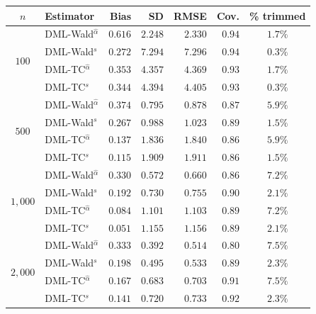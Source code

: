 \begin{tabular}{clrrrrc}
\toprule
$n$ & Estimator & Bias & SD & RMSE & Cov. & \% trimmed \\
\midrule
\multirow{4}{*}{$100$}
  & DML-Wald$^{\hat\alpha}$ & $0.616$ & $2.248$ & $2.330$ & $0.94$ & $1.7\%$ \\
  & DML-Wald$^{s}$          & $0.272$ & $7.294$ & $7.296$ & $0.94$ & $0.3\%$ \\
  & DML-TC$^{\hat\alpha}$   & $0.353$ & $4.357$ & $4.369$ & $0.93$ & $1.7\%$ \\
  & DML-TC$^{s}$            & $0.344$ & $4.394$ & $4.405$ & $0.93$ & $0.3\%$ \\
\midrule
\multirow{4}{*}{$500$}
  & DML-Wald$^{\hat\alpha}$ & $0.374$ & $0.795$ & $0.878$ & $0.87$ & $5.9\%$ \\
  & DML-Wald$^{s}$          & $0.267$ & $0.988$ & $1.023$ & $0.89$ & $1.5\%$ \\
  & DML-TC$^{\hat\alpha}$   & $0.137$ & $1.836$ & $1.840$ & $0.86$ & $5.9\%$ \\
  & DML-TC$^{s}$            & $0.115$ & $1.909$ & $1.911$ & $0.86$ & $1.5\%$ \\
\midrule
\multirow{4}{*}{$1{,}000$}
  & DML-Wald$^{\hat\alpha}$ & $0.330$ & $0.572$ & $0.660$ & $0.86$ & $7.2\%$ \\
  & DML-Wald$^{s}$          & $0.192$ & $0.730$ & $0.755$ & $0.90$ & $2.1\%$ \\
  & DML-TC$^{\hat\alpha}$   & $0.084$ & $1.101$ & $1.103$ & $0.89$ & $7.2\%$ \\
  & DML-TC$^{s}$            & $0.051$ & $1.155$ & $1.156$ & $0.89$ & $2.1\%$ \\
\midrule
\multirow{4}{*}{$2{,}000$}
  & DML-Wald$^{\hat\alpha}$ & $0.333$ & $0.392$ & $0.514$ & $0.80$ & $7.5\%$ \\
  & DML-Wald$^{s}$          & $0.198$ & $0.495$ & $0.533$ & $0.89$ & $2.3\%$ \\
  & DML-TC$^{\hat\alpha}$   & $0.167$ & $0.683$ & $0.703$ & $0.91$ & $7.5\%$ \\
  & DML-TC$^{s}$            & $0.141$ & $0.720$ & $0.733$ & $0.92$ & $2.3\%$ \\
\bottomrule
\end{tabular}
